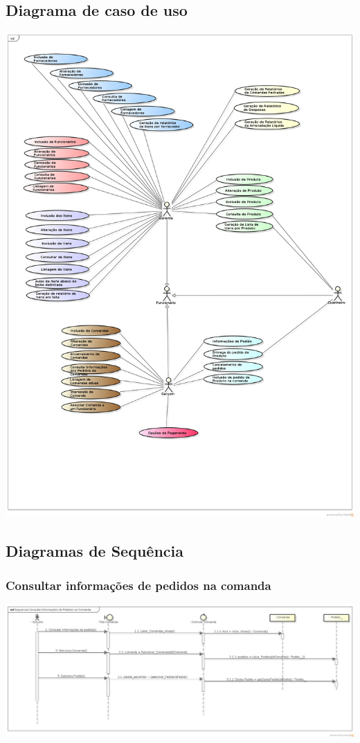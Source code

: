 \subsection{Diagrama de caso de uso}
\centerline{
\includegraphics[scale=0.38]{diagrama/Diagrama_de_Caso_de_Uso.png}
}

\newpage
\subsection{Diagramas de Sequência}
\subsubsection{Consultar informações de pedidos na comanda}
\centerline{
\includegraphics[scale=0.39,angle=90]{diagrama/sequencia_consulta_informacoes_de_pedidos_na_comanda.png}
}

